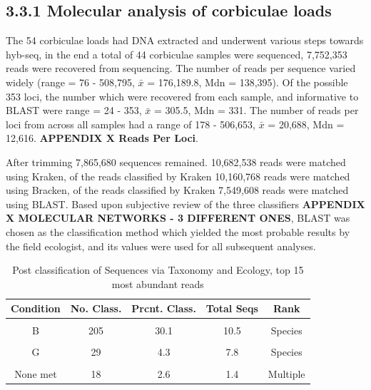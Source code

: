 \documentclass[
]{article}
\begin{document}
\hypertarget{molecular-analysis-of-corbiculae-loads}{%
\subsection{3.3.1 \textbar{} Molecular analysis of corbiculae
loads}\label{molecular-analysis-of-corbiculae-loads}}

The 54 corbiculae loads had DNA extracted and underwent various steps
towards hyb-seq, in the end a total of 44 corbiculae samples were
sequenced, 7,752,353 reads were recovered from sequencing. The number of
reads per sequence varied widely (range = 76 - 508,795, \(\bar{x}\) =
176,189.8, Mdn = 138,395). Of the possible 353 loci, the number which
were recovered from each sample, and informative to BLAST were range =
24 - 353, \(\bar{x}\) = 305.5, Mdn = 331. The number of reads per loci
from across all samples had a range of 178 - 506,653, \(\bar{x}\) =
20,688, Mdn = 12,616. \textbf{APPENDIX X Reads Per Loci}.

After trimming 7,865,680 sequences remained. 10,682,538 reads were
matched using Kraken, of the reads classified by Kraken 10,160,768 reads
were matched using Bracken, of the reads classified by Kraken 7,549,608
reads were matched using BLAST. Based upon subjective review of the
three classifiers \textbf{APPENDIX X MOLECULAR NETWORKS - 3 DIFFERENT
ONES}, BLAST was chosen as the classification method which yielded the
most probable results by the field ecologist, and its values were used
for all subsequent analyses.

\begin{table}

\caption{\label{tab:Read Post Processing}Post classification of Sequences via Taxonomy and Ecology,
top 15 most abundant reads}
\centering
\begin{tabular}[t]{c|c|c|c|c}
\hline
Condition & No. Class. & Prcnt. Class. & Total Seqs & Rank\\
\hline
\cellcolor{gray!10}{A} & \cellcolor{gray!10}{143} & \cellcolor{gray!10}{21.0} & \cellcolor{gray!10}{32.0} & \cellcolor{gray!10}{Species}\\
\hline
B & 205 & 30.1 & 10.5 & Species\\
\hline
\cellcolor{gray!10}{C} & \cellcolor{gray!10}{5} & \cellcolor{gray!10}{0.7} & \cellcolor{gray!10}{0.4} & \cellcolor{gray!10}{Genus}\\
\hline
G & 29 & 4.3 & 7.8 & Species\\
\hline
\cellcolor{gray!10}{H} & \cellcolor{gray!10}{280} & \cellcolor{gray!10}{41.2} & \cellcolor{gray!10}{47.9} & \cellcolor{gray!10}{Genus}\\
\hline
None met & 18 & 2.6 & 1.4 & Multiple\\
\hline
\end{tabular}
\end{table}
\end{document}

